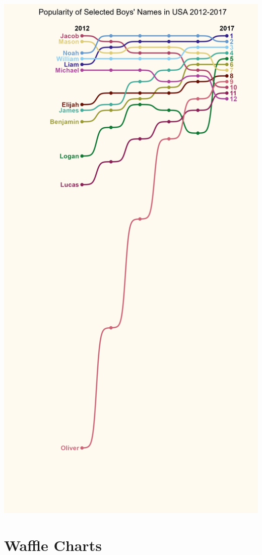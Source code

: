 \documentclass[
  letterpaper,
  DIV=11,
  numbers=noendperiod]{scrreprt}
\begin{document}
\includegraphics{./img/babybump1.png}


\hypertarget{waffle-charts}{%
\chapter{Waffle Charts}\label{waffle-charts}}
\end{document}
